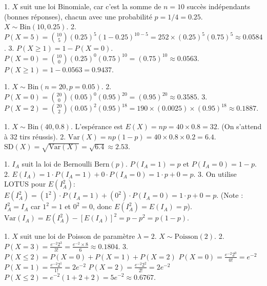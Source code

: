 \begin{correctionbox}
1. $X$ suit une loi Binomiale, car c'est la somme de $n=10$ succès indépendants (bonnes réponses), chacun avec une probabilité $p = 1/4 = 0.25$. $X \sim \text{Bin}(10, 0.25)$.
2. $P(X=5) = \binom{10}{5} (0.25)^5 (1-0.25)^{10-5} = 252 \times (0.25)^5 (0.75)^5 \approx 0.0584$.
3. $P(X \ge 1) = 1 - P(X=0)$.
$P(X=0) = \binom{10}{0} (0.25)^0 (0.75)^{10} = (0.75)^{10} \approx 0.0563$.
$P(X \ge 1) = 1 - 0.0563 = 0.9437$.
\end{correctionbox}

\begin{correctionbox}
1. $X \sim \text{Bin}(n=20, p=0.05)$.
2. $P(X=0) = \binom{20}{0} (0.05)^0 (0.95)^{20} = (0.95)^{20} \approx 0.3585$.
3. $P(X=2) = \binom{20}{2} (0.05)^2 (0.95)^{18} = 190 \times (0.0025) \times (0.95)^{18} \approx 0.1887$.
\end{correctionbox}

\begin{correctionbox}
1. $X \sim \text{Bin}(40, 0.8)$. L'espérance est $E(X) = np = 40 \times 0.8 = 32$. (On s'attend à 32 tirs réussis).
2. $\text{Var}(X) = np(1-p) = 40 \times 0.8 \times 0.2 = 6.4$.
$\text{SD}(X) = \sqrt{\text{Var}(X)} = \sqrt{6.4} \approx 2.53$.
\end{correctionbox}

\begin{correctionbox}
1. $I_A$ suit la loi de Bernoulli $\text{Bern}(p)$.
$P(I_A=1) = p$ et $P(I_A=0) = 1-p$.
2. $E(I_A) = 1 \cdot P(I_A=1) + 0 \cdot P(I_A=0) = 1 \cdot p + 0 = p$.
3. On utilise LOTUS pour $E(I_A^2)$:
$E(I_A^2) = (1^2) \cdot P(I_A=1) + (0^2) \cdot P(I_A=0) = 1 \cdot p + 0 = p$.
(Note : $I_A^2 = I_A$ car $1^2=1$ et $0^2=0$, donc $E(I_A^2) = E(I_A) = p$).
$\text{Var}(I_A) = E(I_A^2) - [E(I_A)]^2 = p - p^2 = p(1-p)$.
\end{correctionbox}

\begin{correctionbox}
1. $X$ suit une loi de Poisson de paramètre $\lambda=2$. $X \sim \text{Poisson}(2)$.
2. $P(X=3) = \frac{e^{-2} 2^3}{3!} = \frac{e^{-2} \times 8}{6} \approx 0.1804$.
3. $P(X \le 2) = P(X=0) + P(X=1) + P(X=2)$
$P(X=0) = \frac{e^{-2} 2^0}{0!} = e^{-2}$
$P(X=1) = \frac{e^{-2} 2^1}{1!} = 2e^{-2}$
$P(X=2) = \frac{e^{-2} 2^2}{2!} = 2e^{-2}$
$P(X \le 2) = e^{-2}(1 + 2 + 2) = 5e^{-2} \approx 0.6767$.
\end{correctionbox}

